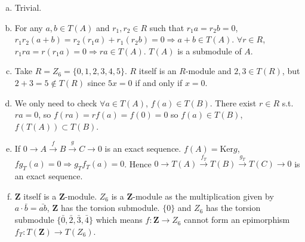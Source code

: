 \begin{answer}
    \begin{enumerate}[(a)]
        \item Trivial.
        \item For any $a,b\in T(A)$ and $r_{1},r_{2}\in R$ such that $r_{1}a=r_{2}b=0$, $r_{1}r_{2}(a+b)=r_{2}(r_{1}a)+r_{1}(r_{2}b)=0\Rightarrow a+b\in T(A)$. $\forall r\in R$, $r_{1}ra=r(r_{1}a)=0\Rightarrow ra\in T(A)$. $T(A)$ is a submodule of $A$.
        \item Take $R=Z_{6}=\{0,1,2,3,4,5\}$. $R$ itself is an $R$-module and $2,3\in T(R)$, but $2+3=5\notin T(R)$ since $5x=0$ if and only if $x=0$.
        \item We only need to check $\forall a\in T(A)$, $f(a)\in T(B)$. There exist $r\in R$ s.t. $ra=0$, so $f(ra)=rf(a)=f(0)=0$ so $f(a)\in T(B)$, $f(T(A))\subset T(B)$.
        \item If $0\to A\xrightarrow{f} B\xrightarrow{g}C\to 0$ is an exact sequence. $f(A)=\mathrm{Ker}g$, $fg_{T}(a)=0\Rightarrow g_{T}f_{T}(a)=0$. Hence $0\to T(A)\xrightarrow{f_{T}}T(B)\xrightarrow{g_{T}}T(C)\to 0$ is an exact sequence.
        \item $\mathbf{Z}$ itself is a $\mathbf{Z}$-module. $Z_{6}$ is a $\mathbf{Z}$-module as the multiplication given by $a\cdot \bar{b}=\bar{ab}$, $\mathbf{Z}$ has the torsion submodule. $\{0\}$ and $Z_{6}$ has the torsion submodule $\{\bar{0},\bar{2},\bar{3},\bar{4}\}$ which means $f:\mathbf{Z}\to Z_{6}$ cannot form an epimorphism $f_{T}:T(\mathbf{Z})\to T(Z_{6})$.
    \end{enumerate}
\end{answer}

$$ $$


